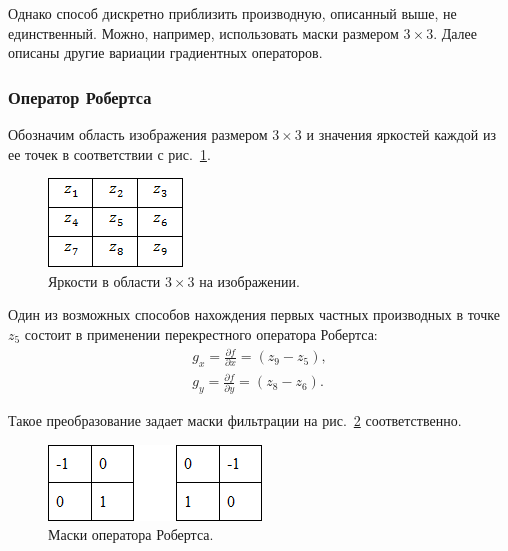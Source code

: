 \documentclass[12pt,a4paper]{article} %
\begin{document}
Однако способ дискретно приблизить производную, описанный выше, не единственный. Можно, например, использовать маски размером $3\times3$. Далее описаны другие вариации градиентных операторов.

\subsubsection{Оператор Робертса}

Обозначим область изображения размером $3\times 3$ и значения яркостей каждой из ее точек в соответствии с рис.~\ref{fig:grad_mask_3}.

\begin{figure}[h]
	
	\centering
	
	\includegraphics[width=0.2\linewidth]{grad_mask_3.jpg}
	
	\caption{Яркости в области $3\times3$ на изображении.}
	
	\label{fig:grad_mask_3}
	
\end{figure}

Один из возможных способов нахождения первых частных производных в точке~$z_5$ состоит в применении перекрестного оператора Робертса:
\begin{gather}\label{grad_mask_3}
	g_x = \frac{\partial f}{\partial x} = (z_9-z_5),\\
	g_y = \frac{\partial f}{\partial y} = (z_8-z_6).
\end{gather}

Такое преобразование задает маски фильтрации на рис.~\ref{fig:grad_mask_rob} соответственно.

\begin{figure}[h]
	
	\centering
	
	\includegraphics[width=0.25\linewidth]{grad_mask_rob.jpg}
	
	\caption{Маски оператора Робертса.}
	
	\label{fig:grad_mask_rob}
	
\end{figure}
\end{document}
